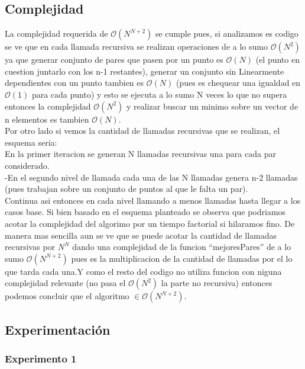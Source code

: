     \subsection{Complejidad}

    	La complejidad requerida de $\mathcal{O}(N^{N+2})$ se cumple pues, si analizamos es codigo se ve que en cada llamada recursiva se realizan operaciones de a lo sumo $\mathcal{O}(N^{2})$ ya que generar conjunto de pares que pasen por un punto es $\mathcal{O}(N)$ (el punto en cuestion juntarlo con los n-1 restantes), generar un conjunto sin Linearmente dependientes con un punto tambien es $\mathcal{O}(N)$ (pues es chequear una igualdad en  $\mathcal{O}(1)$ para cada punto) y esto se ejecuta a lo sumo N veces lo que no supera entonces la complejidad $\mathcal{O}(N^{2})$ y realizar buscar un minimo sobre un vector de n elementos es tambien $\mathcal{O}(N)$. \\
		Por otro lado si vemos la cantidad de llamadas recursivas que se realizan, el esquema seria:\\
		En la primer iteracion se generan N llamadas recursivas una para cada par considerado.\\
		-En el segundo nivel de llamada cada una de las N llamadas genera n-2 llamadas (pues trabajan sobre un conjunto de puntos al que le falta un par). \\ 
		Continua asi entonces en cada nivel llamando a menos llamadas hasta llegar a los casos base.
		Si bien basado en el esquema planteado se observa que podriamos acotar la complejidad del algorimo por un tiempo factorial si hilaramos fino. De manera mas sencilla aun se ve que se puede acotar la cantidad de llamadas recursivas por $N^{N}$ dando una complejidad de la funcion ``mejoresPares'' de a lo sumo $\mathcal{O}(N^{N+2})$ pues es la multiplicacion de la cantidad de llamadas por el lo que tarda cada una.Y como el resto del codigo no utiliza funcion con niguna complejidad relevante (no pasa el $\mathcal{O}(N^{2})$ la parte no recursiva) entonces podemos concluir que el algoritmo $ \in \mathcal{O}(N^{N+2})$.


 


    \subsection{Experimentación}

    	\subsubsection*{Experimento 1}\;

